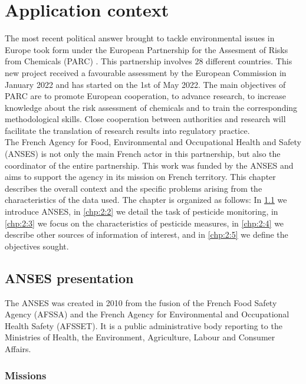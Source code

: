 \chapter{Application context}\label{chp:2}

\minitoc

\clearpage

The most recent political answer brought to tackle environmental issues in Europe took form under the European Partnership for the Assesment of Risks from Chemicals (PARC) \cite{PARC}. This partnership involves 28 different countries. This new project received a favourable assessment by the European Commission in January 2022 and has started on the 1st of May 2022. The main objectives of PARC are to promote European cooperation, to advance research, to increase knowledge about the risk assessment of chemicals and to train the corresponding methodological skills. Close cooperation between authorities and research will facilitate the translation of research results into regulatory practice. \\
The French Agency for Food, Environmental and Occupational Health and Safety (ANSES) is not only the main French actor in this partnership, but also the coordinator of the entire partnership. This work was funded by the ANSES and aims to support the agency in its mission on French territory. This chapter describes the overall context and the specific problems arising from the characteristics of the data used. The chapter is organized as follows: In \ref{chp:2:1} we introduce ANSES, in \ref{chp:2:2} we detail the task of pesticide monitoring, in \ref{chp:2:3} we focus on the characteristics of pesticide measures, in \ref{chp:2:4} we describe other sources of information of interest, and in \ref{chp:2:5} we define the objectives sought.    

\section{ANSES presentation}\label{chp:2:1}

The ANSES was created in 2010 from the fusion of the French Food Safety Agency (AFSSA) and the French Agency for Environmental and Occupational Health Safety (AFSSET). It is a public administrative body reporting to the Ministries of Health, the Environment, Agriculture, Labour and Consumer Affairs.  

\subsection{Missions} 

